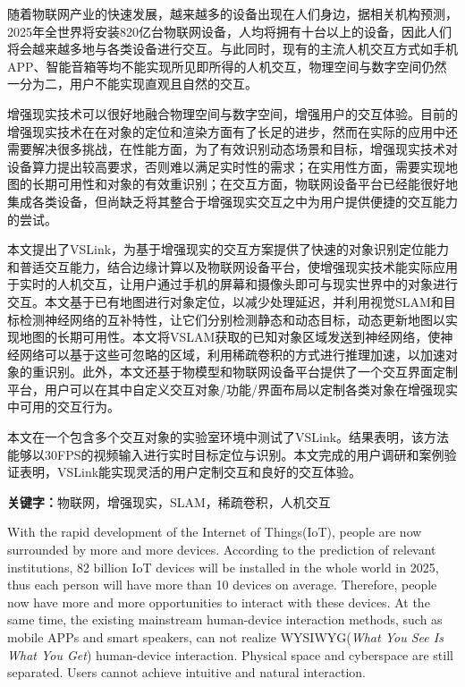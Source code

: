 \cleardoublepage
{}
随着物联网产业的快速发展，越来越多的设备出现在人们身边，据相关机构预测\cite{macgillivray2019worldwide}，2025年全世界将安装820亿台物联网设备，人均将拥有十台以上的设备，因此人们将会越来越多地与各类设备进行交互。与此同时，现有的主流人机交互方式如手机APP、智能音箱等均不能实现所见即所得的人机交互，物理空间与数字空间仍然一分为二，用户不能实现直观且自然的交互。

增强现实技术可以很好地融合物理空间与数字空间，增强用户的交互体验。目前的增强现实技术在在对象的定位和渲染方面有了长足的进步，然而在实际的应用中还需要解决很多挑战，在性能方面，为了有效识别动态场景和目标，增强现实技术对设备算力提出较高要求，否则难以满足实时性的需求；在实用性方面，需要实现地图的长期可用性和对象的有效重识别；在交互方面，物联网设备平台已经能很好地集成各类设备，但尚缺乏将其整合于增强现实交互之中为用户提供便捷的交互能力的尝试。

本文提出了VSLink，为基于增强现实的交互方案提供了快速的对象识别定位能力和普适交互能力，结合边缘计算以及物联网设备平台，使增强现实技术能实际应用于实时的人机交互，让用户通过手机的屏幕和摄像头即可与现实世界中的对象进行交互。本文基于已有地图进行对象定位，以减少处理延迟，并利用视觉SLAM和目标检测神经网络的互补特性，让它们分别检测静态和动态目标，动态更新地图以实现地图的长期可用性。本文将VSLAM获取的已知对象区域发送到神经网络，使神经网络可以基于这些可忽略的区域，利用稀疏卷积的方式进行推理加速，以加速对象的重识别。此外，本文还基于物模型和物联网设备平台提供了一个交互界面定制平台，用户可以在其中自定义交互对象/功能/界面布局以定制各类对象在增强现实中可用的交互行为。

本文在一个包含多个交互对象的实验室环境中测试了VSLink。结果表明，该方法能够以30FPS的视频输入进行实时目标定位与识别。本文完成的用户调研和案例验证表明，VSLink能实现灵活的用户定制交互和良好的交互体验。

\noindent\textbf{关键字：}物联网，增强现实，SLAM，稀疏卷积，人机交互

\cleardoublepage
{}
With the rapid development of the Internet of Things(IoT), people are now surrounded by more and more devices. According to the prediction of relevant institutions\cite{macgillivray2019worldwide}, 82 billion IoT devices will be installed in the whole world in 2025, thus each person will have more than 10 devices on average. Therefore, people now have more and more opportunities to interact with these devices. At the same time, the existing mainstream human-device interaction methods, such as mobile APPs and smart speakers, can not realize WYSIWYG(\textit{What You See Is What You Get}) human-device interaction. Physical space and cyberspace are still separated. Users cannot achieve intuitive and natural interaction. 

